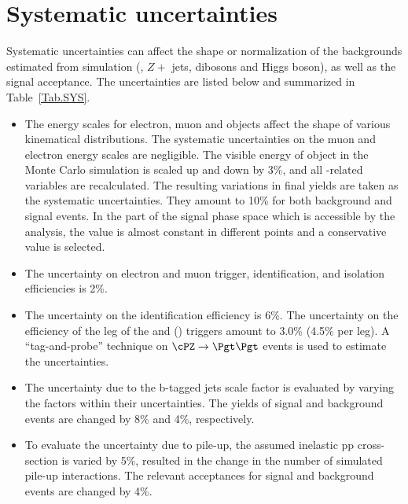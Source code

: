 \section{Systematic uncertainties}
\label{sect:sys}
Systematic uncertainties can affect the shape or normalization of the
backgrounds estimated from simulation (\ttbar, $Z+$ jets, dibosons and Higgs boson), 
as well as the signal acceptance. 
The uncertainties are listed below and summarized in Table~\ref{Tab.SYS}.


\begin{itemize}

\item  The energy scales for electron, muon and \Tau objects affect the shape of various kinematical distributions.
 The systematic uncertainties on the muon and electron energy scales are negligible.
The visible energy of \Tau object in the Monte Carlo simulation is scaled up and down
by 3\%, and all \Tau-related variables are recalculated. The resulting variations in
final yields are taken as the systematic uncertainties. They amount to 10\% for both
background and signal events. In the part of the signal phase space which is accessible by
the analysis, the value is almost constant in different points and a conservative value
is selected.


\item The uncertainty on electron and muon trigger, identification, and
  isolation efficiencies is 2\%.

\item The uncertainty on the \Tau identification efficiency is 6\%. 
  The uncertainty on the efficiency of the \Tau leg of the \eTau and
  \muTau (\tauTau) triggers amount to 3.0\% (4.5\% per leg).
  A ``tag-and-probe'' technique on $\cPZ\to \Pgt\Pgt$ events is used to estimate the 
  uncertainties.

\item The uncertainty due to the b-tagged jets scale factor is evaluated by varying the 
factors within their uncertainties. The yields of signal and background events are changed by 8\% 
and 4\%, respectively.
 
\item To evaluate the uncertainty due to pile-up, the assumed inelastic pp cross-section is
  varied by 5\%, resulted in the change in the number of simulated pile-up interactions.
 The relevant acceptances for signal and background events are changed by 4\%.



\end{itemize}

